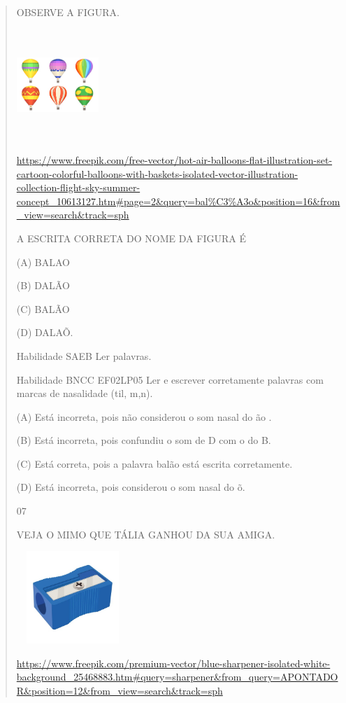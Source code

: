 {{{{\begin{verse}
{{\begin{escolha}
{{{{{OBSERVE A FIGURA.

\includegraphics[width=1.22569in,height=1.65417in]{media/image167.jpeg}

\url{https://www.freepik.com/free-vector/hot-air-balloons-flat-illustration-set-cartoon-colorful-balloons-with-baskets-isolated-vector-illustration-collection-flight-sky-summer-concept_10613127.htm\#page=2\&query=bal\%C3\%A3o\&position=16\&from_view=search\&track=sph}

A ESCRITA CORRETA DO NOME DA FIGURA É

(A) BALAO

(B) DALÃO

(C) BALÃO

(D) DALAÕ.

Habilidade SAEB Ler palavras.

Habilidade BNCC EF02LP05 Ler e escrever corretamente palavras com marcas
de nasalidade (til, m,n).

(A) Está incorreta, pois não considerou o som nasal do ão .

(B) Está incorreta, pois confundiu o som de D com o do B.

(C) Está correta, pois a palavra balão está escrita corretamente.

(D) Está incorreta, pois considerou o som nasal do õ.

\num{07}

VEJA O MIMO QUE TÁLIA GANHOU DA SUA AMIGA.

\includegraphics[width=1.67273in,height=1.37251in]{media/image168.jpeg}

\url{https://www.freepik.com/premium-vector/blue-sharpener-isolated-white-background_25468883.htm\#query=sharpener\&from_query=APONTADOR\&position=12\&from_view=search\&track=sph}

}}}}}
\end{escolha}}}
\end{verse}}}}}
